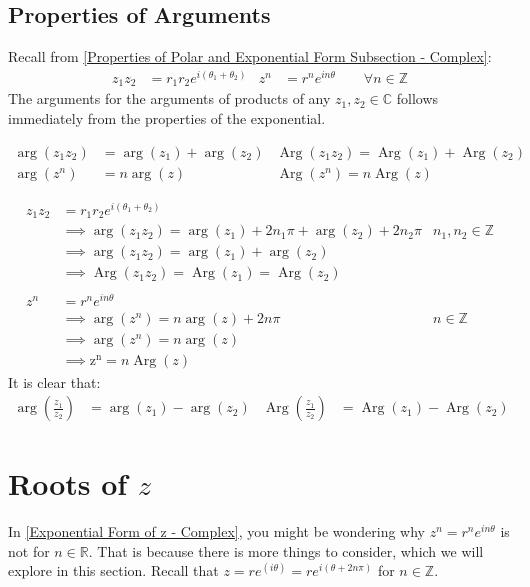 \documentclass[12pt, english]{book}
\makeatletter
\DeclareMathOperator\Arg{Arg}
\renewenvironment{proof}[1][\proofname]{\par
	\pushQED{\qed}%
	\normalfont \topsep6\p@\@plus6\p@\relax
	\list{}{%
		\settowidth{\leftmargin}{\itshape\proofname:\hskip\labelsep}%
		\setlength{\labelwidth}{0pt}%
		\setlength{\itemindent}{-\leftmargin}%
		}%
	\item[\hskip\labelsep\itshape#1\@addpunct{:}]\ignorespaces
	}{\popQED\endlist\@endpefalse}
\makeatother
\begin{document}
	\subsection{Properties of Arguments} \label{Properties of Argumetns Subsection - Complex}
	Recall from \cref{Properties of Polar and Exponential Form Subsection - Complex}: 
	\begin{align*}
		z_1  z_2 &= r_1 r_2 e^{i(\theta_1 + \theta_2)} 
		& z^n &= r^n e^{i n \theta} \qquad \forall n \in \mathbb{Z}
	\end{align*}
	The arguments for the arguments of products of any $z_1, z_2 \in \mathbb{C}$ follows immediately from the properties of the exponential.
	\begin{corollary}
		\begin{align*}
			\arg(z_1 z_2) &= \arg(z_1) + \arg(z_2)
				& \Arg(z_1 z_2) = \Arg(z_1) + \Arg(z_2) \\
			\arg(z^n) &= n\arg(z)  
				& \Arg(z^n) = n\Arg(z)
		\end{align*}
		\label{Arguments of Products Corollary - Complex}
	\end{corollary}
	\begin{proof}
		\begin{align*}
			z_1  z_2 &= r_1 r_2 e^{i(\theta_1 + \theta_2)} & \\
			&\implies \arg(z_1 z_2) = \arg(z_1) + 2n_1 \pi + \arg(z_2) + 2n_2\pi
				& n_1, n_2 \in \mathbb{Z} \\
			&\implies \arg(z_1 z_2) = \arg(z_1) + \arg(z_2) & \\
			&\implies \Arg(z_1 z_2) = \Arg(z_1) = \Arg(z_2)  \\
			\\
			z^n &= r^n e^{i n\theta} & \\
			&\implies \arg(z^n) = n\arg(z) + 2n\pi & n \in \mathbb{Z} \\
			&\implies \arg(z^n) = n\arg(z)  \\
			&\implies \operatorname{z^n} = n\Arg(z)
		\end{align*}
	\end{proof}
	It is clear that: 
	\begin{align*}
		\arg\left(\frac{z_1}{z_2}\right) &= \arg(z_1) - \arg(z_2)
			& \Arg\left(\frac{z_1}{z_2}\right) &= \Arg(z_1) - \Arg(z_2)
	\end{align*}

	\section{Roots of \texorpdfstring{\(z\)}{TEXT}} \label{Roots of z Sections - Complex}
	In \cref{Exponential Form of z - Complex}, you might be wondering why $z^n = r^n e^{i n \theta}$ is not for $n \in \mathbb{R}$. That is because there is more things to consider, which we will explore in this section. Recall that $z = re^(i \theta) = re^{i (\theta + 2n \pi)}$ for $n \in \mathbb{Z}$. 
	
\end{document}

